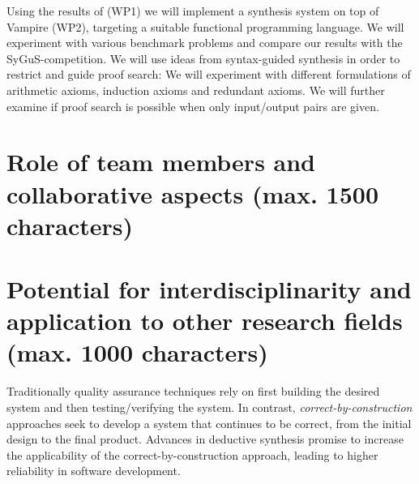 \documentclass[a4paper,12pt]{article}
\begin{document}
Using the results of (WP1) we will implement a synthesis system on top of Vampire (WP2), targeting a suitable functional programming language.
We will experiment with various benchmark problems %
and compare our results with the SyGuS-competition.
We will use ideas from syntax-guided synthesis in order to restrict and guide proof search:
We will experiment with different formulations of arithmetic axioms, induction axioms and redundant axioms.
We will further examine if proof search is possible when only input/output pairs are given.
	
\section{Role of team members and collaborative aspects (max. 1500 characters)}

\section{Potential for interdisciplinarity and application to other research fields (max. 1000 characters)}


Traditionally quality assurance techniques rely on first building the desired system and then testing/verifying the system.
In contrast, \emph{correct-by-construction} approaches seek to develop a system that continues to be correct, from the initial design to the final product.
Advances in deductive synthesis promise to increase the applicability of the correct-by-construction approach, leading to higher reliability in software development.
\end{document}
